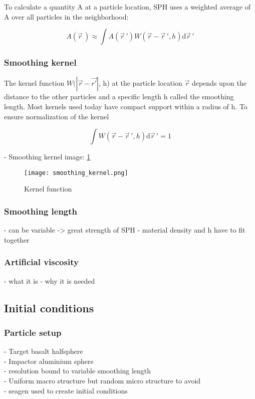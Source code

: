 To calculate a quantity A at a particle location, SPH uses a weighted average of A over all particles in the neighborhood:

\begin{equation}
    A(\vec{r}\,) \approx \int A(\vec{r}\,') W(\vec{r} - \vec{r}\,', h) \mathrm d\vec{r}\,'
\end{equation}

\subsubsection{Smoothing kernel}
The kernel function $W(|\vec{r} - \vec{r'}|$, h) at the particle location $\vec{r}$ depends upon the distance to the other particles and a specific length h called the smoothing length. Most kernels used today have compact support within a radius of h. To ensure normalization of the kernel

\begin{equation} \label{eq:kernel_normalization}
    \int W(\vec{r} - \vec{r}\,', h)\mathrm d\vec{r}\,' = 1
\end{equation}

- Smoothing kernel image: \ref{fig:smoothing_kernel}

\begin{figure}[H]
    \centering
    \texttt{[image: smoothing\_kernel.png]}
    \caption{Kernel function \cite{image:smoothing_kernel}}
    \label{fig:smoothing_kernel}
\end{figure}

\subsubsection{Smoothing length}
- can be variable -> great strength of SPH
- material density and h have to fit together

\subsubsection{Artificial viscosity}
- what it is
- why it is needed


\subsection{Initial conditions}
\subsubsection{Particle setup}
- Target basalt halfsphere \\
- Impactor aluminium sphere \\
- resolution bound to variable smoothing length \\
- Uniform macro structure but random micro structure to avoid \\
- seagen \cite{github:SEAGen} used to create initial conditions

